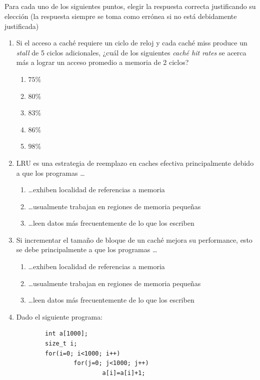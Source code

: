\subsection{}
Para cada uno de los siguientes puntos, elegir la respuesta correcta justificando su elección (la respuesta siempre se toma como errónea si no está debidamente justificada)

\begin{enumerate}
\item	Si el acceso a caché requiere un ciclo de reloj y cada caché
		miss produce un \emph{stall} de 5 ciclos adicionales, ¿cuál de
		los siguientes \emph{caché hit rates} se acerca más a lograr un
		acceso promedio a memoria de 2 ciclos?

		\begin{enumerate}
		\item	$75\%$
		\item	$80\%$
		\item	$83\%$
		\item	$86\%$
		\item	$98\%$
		\end{enumerate}
\item	LRU es una estrategia de reemplazo en caches efectiva
		principalmente debido a que los programas \ldots

		\begin{enumerate}
		\item	\ldots exhiben localidad de referencias a memoria
		\item	\ldots usualmente trabajan en regiones de memoria
			pequeñas
		\item	\ldots leen datos más frecuentemente de lo que los
			escriben
		\end{enumerate}
\item	Si incrementar el tamaño de bloque de un caché mejora su
		performance, esto se debe principalmente a que los programas 
		\ldots

		\begin{enumerate}
		\item	\ldots exhiben localidad de referencias a memoria
		\item	\ldots usualmente trabajan en regiones de memoria pequeñas
		\item	\ldots leen datos más frecuentemente de lo que los escriben
		\end{enumerate}

\item	Dado el siguiente programa:
		\begin{small}
		\begin{verbatim}
		int a[1000];
		size_t i;
		for(i=0; i<1000; i++)
		        for(j=0; j<1000; j++)
		                a[i]=a[i]+1;
		\end{verbatim}
		\end{small}


\end{enumerate}
